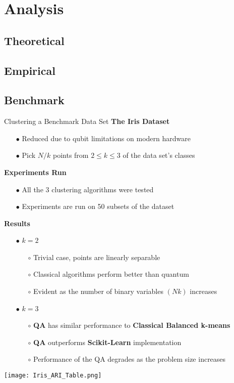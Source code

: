 \section{Analysis}
	\subsection{Theoretical}
	
	\subsection{Empirical}
	
	\subsection{Benchmark}
		\begin{frame}[allowframebreaks]{Clustering a Benchmark Data Set}
			\textbf{The Iris Dataset}
			\begin{itemize}
				\item[$\bullet$] Reduced due to qubit limitations on modern hardware
				\item[$\bullet$] Pick $N/k$ points from $2\leq k \leq3$ of the data set's classes
			\end{itemize}
		
			\textbf{Experiments Run}
			\begin{itemize}
				\item[$\bullet$] All the 3 clustering algorithms were tested
				\item[$\bullet$] Experiments are run on 50 subsets of the dataset
			\end{itemize}
		
			\textbf{Results}
			\begin{itemize}
				\item[$\bullet$] $k=2$
				\begin{itemize}
					\item[$\circ$] Trivial case, points are linearly separable
					\item[$\circ$] Classical algorithms perform better than quantum
					\item[$\circ$] Evident as the number of binary variables $(Nk)$ increases
				\end{itemize}
				\framebreak
				\item[$\bullet$] $k=3$
				\begin{itemize}
					\item[$\circ$] \textbf{QA} has similar performance to \textbf{Classical Balanced k-means}
					\item[$\circ$] \textbf{QA} outperforms \textbf{Scikit-Learn} implementation
					\item[$\circ$] Performance of the QA degrades as the problem size increases
				\end{itemize}
			\end{itemize}
			\begin{center}
				\texttt{[image: Iris\_ARI\_Table.png]}
			\end{center}
		\end{frame}